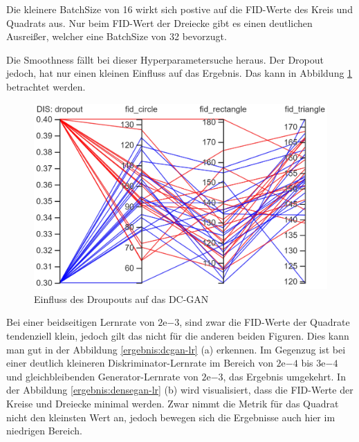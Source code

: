 Die kleinere BatchSize von 16 wirkt sich postive auf die FID-Werte des Kreis und Quadrats aus.
Nur beim FID-Wert der Dreiecke gibt es einen deutlichen Ausreißer, welcher eine BatchSize von 32 bevorzugt.
\newline

Die Smoothness fällt bei dieser Hyperparametersuche heraus.
Der Dropout jedoch, hat nur einen kleinen Einfluss auf das Ergebnis. 
Das kann in Abbildung \ref{ergebnis:dcgan-hyper-dropout} betrachtet werden.

\begin{figure}[H]
	\centering
	\includegraphics[width=0.5\textheight]{kapitel/5_ergebnisse/dcgan/hyperparameter_droupout.PNG}
	\caption{Einfluss des Droupouts auf das DC-GAN}
	\label{ergebnis:dcgan-hyper-dropout}
\end{figure}

Bei einer beidseitigen Lernrate von $2\mathrm{e}{-3}$, sind zwar die FID-Werte der Quadrate tendenziell klein, jedoch gilt das nicht für die anderen beiden Figuren.
Dies kann man gut in der Abbildung \ref{ergebnis:dcgan-lr} (a) erkennen.
Im Gegenzug ist bei einer deutlich kleineren Diskriminator-Lernrate im Bereich von $2\mathrm{e}{-4}$ bis $3\mathrm{e}{-4}$ und gleichbleibenden Generator-Lernrate von $2\mathrm{e}{-3}$, das Ergebnis umgekehrt.
In der Abbildung \ref{ergebnis:densegan-lr} (b) wird visualisiert, dass die FID-Werte der Kreise und Dreiecke minimal werden.
Zwar nimmt die Metrik für das Quadrat nicht den kleinsten Wert an, jedoch bewegen sich die Ergebnisse auch hier im niedrigen Bereich. 

